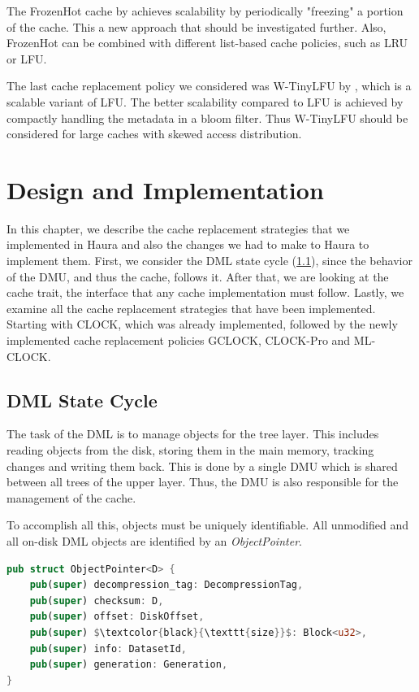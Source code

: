 \documentclass[
	12pt,
	a4paper,
	abstract,
	bibliography=totoc,
	chapterprefix,
	headings=openright,
	numbers=endperiod,
	parskip=half,
	twoside,
]{scrreprt}
\begin{document}
The FrozenHot cache by \cite{qiu2023frozenhot} achieves scalability by periodically "freezing" 
a portion of the cache. This a new approach that should be investigated further. 
Also, FrozenHot can be combined with different list-based cache policies, such as LRU or LFU.

The last cache replacement policy we considered was W-TinyLFU by \cite{einziger2017tinylfu},
which is a scalable variant of LFU.
The better scalability compared to LFU is achieved by compactly handling the metadata in a bloom filter.
Thus W-TinyLFU should be considered for large caches with skewed access distribution.


\chapter{Design and Implementation}
\label{cha:design and implementation}

In this chapter, we describe the cache replacement strategies that we implemented in Haura 
and also the changes we had to make to Haura to implement them.
First, we consider the DML state cycle (\cref{sec:dml state cycle}), 
since the behavior of the DMU, and thus the cache, follows it.
After that, we are looking at the cache trait, the interface that any cache implementation must follow.
Lastly, we examine all the cache replacement strategies that have been implemented.
Starting with CLOCK, which was already implemented,
followed by the newly implemented cache replacement policies GCLOCK, CLOCK-Pro and ML-CLOCK.

\section{DML State Cycle}
\label{sec:dml state cycle}

The task of the DML is to manage objects for the tree layer. 
This includes reading objects from the disk, storing them in the main memory, tracking changes and writing them back.
This is done by a single DMU which is shared between all trees of the upper layer.
Thus, the DMU is also responsible for the management of the cache.

To accomplish all this, objects must be uniquely identifiable.
All unmodified and all on-disk DML objects are identified by an \emph{ObjectPointer}.

\bigskip

\begin{lstlisting}[language=Rust,mathescape=true,caption=ObjectPointer struct ,label=lst:ObjectPointer struct]
pub struct ObjectPointer<D> {
    pub(super) decompression_tag: DecompressionTag,
    pub(super) checksum: D,
    pub(super) offset: DiskOffset,
    pub(super) $\textcolor{black}{\texttt{size}}$: Block<u32>,
    pub(super) info: DatasetId,
    pub(super) generation: Generation,
}
\end{lstlisting}
\end{document}

